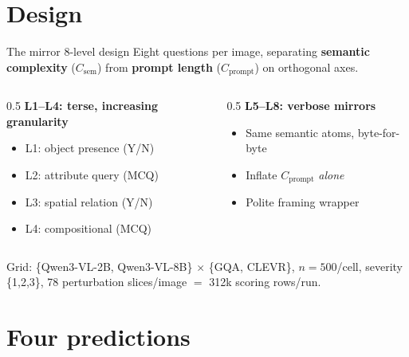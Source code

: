 \documentclass[aspectratio=169,11pt]{beamer}
\newcommand{\Csem}{C_{\mathrm{sem}}}
\newcommand{\Cprompt}{C_{\mathrm{prompt}}}
\begin{document}
\section{Design}

\begin{frame}{The mirror 8-level design}
  Eight questions per image, separating \textbf{semantic complexity} ($\Csem$)
  from \textbf{prompt length} ($\Cprompt$) on orthogonal axes.
  \medskip
  \begin{columns}[T]
    \begin{column}{0.5\textwidth}
      \textbf{L1--L4: terse, increasing granularity}
      \begin{itemize}\small
        \item L1: object presence (Y/N)
        \item L2: attribute query (MCQ)
        \item L3: spatial relation (Y/N)
        \item L4: compositional (MCQ)
      \end{itemize}
    \end{column}
    \begin{column}{0.5\textwidth}
      \textbf{L5--L8: verbose mirrors}
      \begin{itemize}\small
        \item Same semantic atoms, byte-for-byte
        \item Inflate $\Cprompt$ \emph{alone}
        \item Polite framing wrapper
      \end{itemize}
    \end{column}
  \end{columns}
  \vfill
  \footnotesize\textcolor{pgray}{Grid: \{Qwen3-VL-2B, Qwen3-VL-8B\} $\times$ \{GQA, CLEVR\},
  $n=500$/cell, severity \{1,2,3\}, 78 perturbation slices/image $=$ 312k scoring rows/run.}
\end{frame}

\section{Four predictions}
\end{document}
